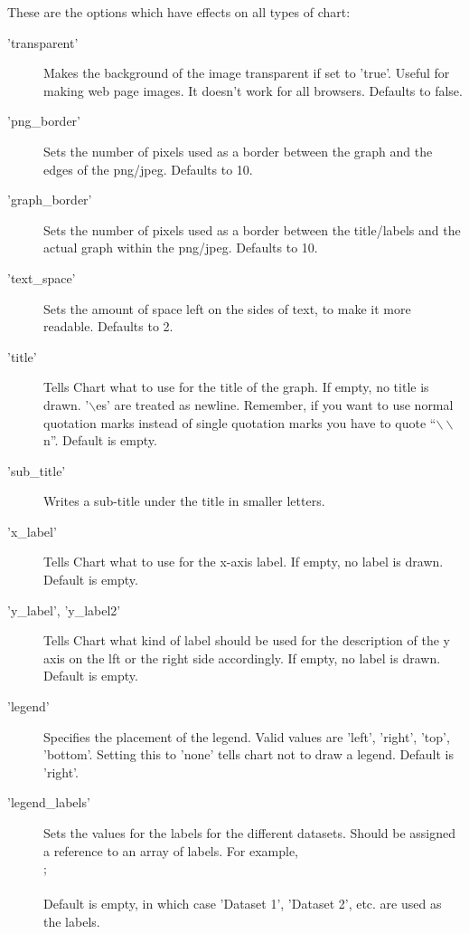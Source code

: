    
\label{options}
\Attributes
These are the options which have effects on all types of chart:
\begin{description}
\item ['transparent']Makes the background of the image transparent if set to 'true'. 
                    Useful for making web page images. 
                    It doesn't work for all browsers. 
                    Defaults to false.

\item ['png\_border']Sets the number of pixels 
                     used as a border between the graph and the edges of the png/jpeg. 
                     Defaults to 10.
                     
\item ['graph\_border']
        Sets the number of pixels used as a border between the title/labels 
        and the actual graph within the png/jpeg. Defaults to 10.

\item['text\_space']
       Sets the amount of space left on the sides of text, to make it more readable.  Defaults to 2.

\item['title']Tells Chart what to use for the title of the graph.  
      If empty, no title is drawn.  
      '$\backslash$es' are treated as newline. 
      Remember, if you want to use normal quotation marks instead of single quotation marks 
      you have to quote "`$\backslash\backslash$n"'. Default is empty.

\item['sub\_title']Writes a sub-title under the title in smaller letters.

\item['x\_label']Tells Chart what to use for the x-axis label.  
                 If empty, no label is drawn.  Default is empty.
                 
\item['y\_label', 'y\_label2']Tells Chart what kind of label should be used for the description
          of the y axis on the lft or the right side accordingly.  
          If empty, no label is drawn.  Default is empty.

\item['legend']Specifies the placement of the legend.  
             Valid values are 'left', 'right', 'top', 'bottom'.  
             Setting this to 'none' tells chart not to draw a legend.  Default is 'right'.

\item['legend\_labels']
            Sets the values for the labels for the different datasets. 
            Should be assigned a reference to an array of labels.  For example,\\
            ;\\
            \\
            Default is empty, in which case 'Dataset 1', 'Dataset 2', etc.
             are used as the labels.
             

\end{description}
